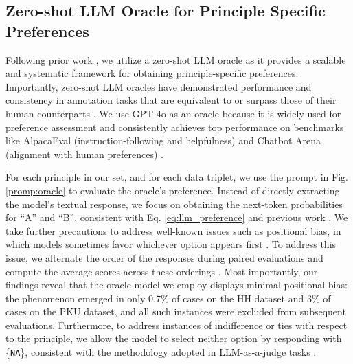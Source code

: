 \documentclass{article}
\begin{document}
\subsection{Zero-shot LLM Oracle for Principle Specific Preferences}\label{sec:oracle}
Following prior work \cite{dong2023steerlmattributeconditionedsft, mu2024rule}, we utilize a zero-shot LLM oracle as it provides a scalable and systematic framework for obtaining principle-specific preferences. Importantly, zero-shot LLM oracles have demonstrated performance and consistency in annotation tasks that are equivalent to or surpass those of their human counterparts \cite{Gilardi_2023, ziems2024largelanguagemodelstransform}. We use GPT-4o as an oracle because it is widely used for preference assessment \cite{raju2024constructingdomainspecificevaluationsets, li2024crowdsourceddatahighqualitybenchmarks, wei2024systematicevaluationllmasajudgellm} and consistently achieves top performance on benchmarks like AlpacaEval (instruction-following and helpfulness) \cite{dubois2023alpacafarm} and Chatbot Arena (alignment with human preferences) \cite{chiang2024chatbotarenaopenplatform}.

For each principle in our set, and for each data triplet, we use the prompt in Fig. \ref{promp:oracle} to evaluate the oracle's preference. Instead of directly extracting the model's textual response, we focus on obtaining the next-token probabilities for ``A'' and ``B'', consistent with Eq. \ref{eq:llm_preference} and previous work \cite{ lee2023rlaif, liu2024aligning}. We take further precautions to address well-known issues such as positional bias, in which models sometimes favor whichever option appears first \cite{wang2023largelanguagemodelsfair, zheng2023judging}. To address this issue, we alternate the order of the responses during paired evaluations and compute the average scores across these orderings \cite{li2024dissecting,panickssery2024llm}. Most importantly, our findings reveal that the oracle model we employ displays minimal positional bias: the phenomenon emerged in only 0.7\% of cases on the HH dataset and 3\% of cases on the PKU dataset, and all such instances were excluded from subsequent evaluations. Furthermore, to address instances of indifference or ties with respect to the principle, we allow the model to select neither option by responding with \{\texttt{NA}\}, consistent with the methodology adopted in LLM-as-a-judge tasks \cite{zheng2023judging}.
\end{document}
